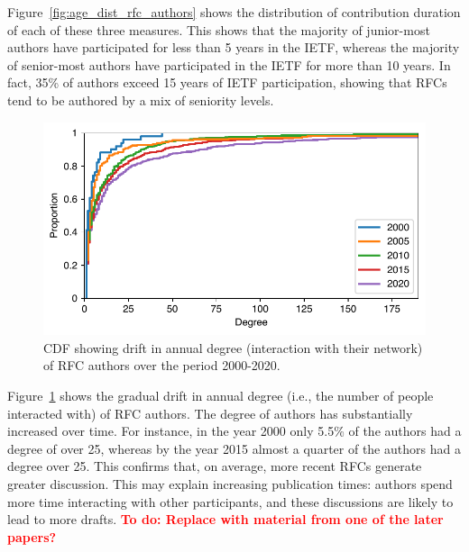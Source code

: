 \documentclass[twocolumn,10pt]{article}
\newlength{\figureWidthOneColumn}
\newcommand{\todo}[1]{\textbf{\textcolor{red}{To do: #1}}}
\newcommand{\pb}[1]{\vspace{0.75ex}\noindent{\textbf{#1}}}
\begin{document}
Figure~\ref{fig:age_dist_rfc_authors} shows the distribution of
contribution duration of each of these three measures. This shows that the
majority of junior-most authors have participated for less than 5 years in
the IETF, whereas the majority of senior-most authors have participated in
the IETF for more than 10 years. In fact, 35\% of authors exceed 15 years
of IETF participation, showing that RFCs tend to be authored by a mix of
seniority levels.

\begin{figure}
  \centering
  \includegraphics[width=\figureWidthOneColumn]{figures-prev/imc-2021/emails/rfc_authors_degree.pdf}
  \caption{
    CDF showing drift in annual degree (interaction with their network)
    of RFC authors over the period 2000-2020.
  }
  \label{fig:degree_dist_rfc_authors}
\end{figure}

\pb{Evolution of interactions:}
Figure~\ref{fig:degree_dist_rfc_authors} shows the gradual drift in annual
degree (i.e., the number of people interacted with) of RFC authors. The
degree of authors has substantially increased over time. For instance, in
the year 2000 only 5.5\% of the authors had a degree of over 25, whereas by
the year 2015 almost a quarter of the authors had a degree over 25.  This
confirms that, on average, more recent RFCs generate greater discussion.
This may explain increasing publication times: authors spend more time
interacting with other participants, and these discussions are likely to
lead to more drafts.
\todo{Replace with material from one of the later papers?}
\end{document}
